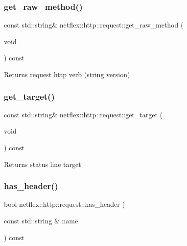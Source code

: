 \subsubsection{\texorpdfstring{get\+\_\+raw\+\_\+method()}{get\_raw\_method()}}
{\footnotesize\ttfamily const std\+::string\& netflex\+::http\+::request\+::get\+\_\+raw\+\_\+method (\begin{DoxyParamCaption}\item[{void}]{ }\end{DoxyParamCaption}) const}

\begin{DoxyReturn}{Returns}
request http verb (string version) 
\end{DoxyReturn}
\mbox{\label{classnetflex_1_1http_1_1request_aed90cb36a29b9bd2b0346ba0f399615a}} 
\subsubsection{\texorpdfstring{get\+\_\+target()}{get\_target()}}
{\footnotesize\ttfamily const std\+::string\& netflex\+::http\+::request\+::get\+\_\+target (\begin{DoxyParamCaption}\item[{void}]{ }\end{DoxyParamCaption}) const}

\begin{DoxyReturn}{Returns}
status line target 
\end{DoxyReturn}
\mbox{\label{classnetflex_1_1http_1_1request_a906fb3043367133866daa9f18ad97393}} 
\subsubsection{\texorpdfstring{has\+\_\+header()}{has\_header()}}
{\footnotesize\ttfamily bool netflex\+::http\+::request\+::has\+\_\+header (\begin{DoxyParamCaption}\item[{const std\+::string \&}]{name }\end{DoxyParamCaption}) const}


